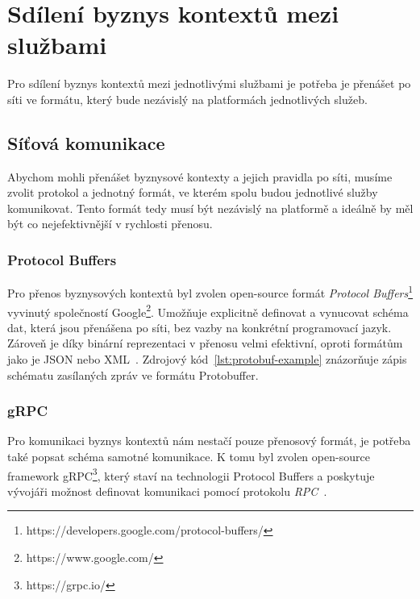 \section{Sdílení byznys kontextů mezi službami}

Pro sdílení byznys kontextů mezi jednotlivými službami
je potřeba je přenášet po síti ve formátu, který bude
nezávislý na platformách jednotlivých služeb.

\subsection{Síťová komunikace}

Abychom mohli přenášet byznysové kontexty a jejich pravidla
po síti, musíme zvolit protokol a jednotný formát, ve kterém
spolu budou jednotlivé služby komunikovat.
Tento formát tedy musí být nezávislý na platformě a ideálně
by měl být co nejefektivnější v rychlosti přenosu.

\subsubsection{Protocol Buffers}

Pro přenos byznysových kontextů byl zvolen open-source formát
\textit{Protocol Buffers}\footnote{
https://developers.google.com/protocol-buffers/
}
vyvinutý společností Google\footnote{
https://www.google.com/
}. Umožňuje explicitně definovat a vynucovat schéma dat,
která jsou přenášena po síti, bez vazby na konkrétní programovací
jazyk. Zároveň je díky binární reprezentaci v přenosu velmi efektivní,
oproti formátům jako je JSON nebo XML~\cite{varda2008protocol}.
Zdrojový kód~\ref{lst:protobuf-example} znázorňuje zápis schématu
zasílaných zpráv ve formátu Protobuffer.



\subsubsection{gRPC}

Pro komunikaci byznys kontextů nám nestačí pouze přenosový formát,
je potřeba také popsat schéma samotné komunikace. K tomu byl zvolen
open-source framework gRPC\footnote{
https://grpc.io/
}, který staví na technologii Protocol Buffers a poskytuje vývojáři
možnost definovat komunikaci pomocí protokolu \textit{RPC}~\cite{nelson1981remote}.

